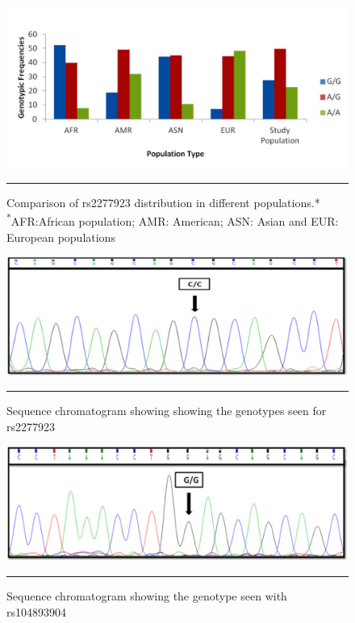 \begin{refsection}
\begin{figure}[!htb]
\centering
\includegraphics[width=\linewidth]{Figures/Figure5_9.pdf}
\rule{35em}{0.5pt}
\caption[Comparison of rs2277923 distribution in different populations]{Comparison of rs2277923 distribution in different populations.*\\{\textsuperscript{*}\footnotesize{AFR:African population; AMR: American; ASN: Asian and EUR: European populations}}}
\label{fig:5_9}
\end{figure}

\begin{figure}[!htb]
\centering
\includegraphics[width=\linewidth]{Figures/Figure5_6.pdf}
\rule{35em}{0.5pt}
\caption[Sequence chromatogram showing showing the genotypes seen for rs2277923]{Sequence chromatogram showing showing the genotypes seen for rs2277923}
\label{fig:5_6}
\end{figure}

\begin{figure}[!htb]
\centering
\includegraphics[width=\linewidth]{Figures/Figure5_7.pdf}
\rule{35em}{0.5pt}
\caption[Sequence chromatogram showing the genotype seen with rs104893904]{Sequence chromatogram showing the genotype seen with rs104893904}
\label{fig:5_7}
\end{figure}


\end{refsection}
